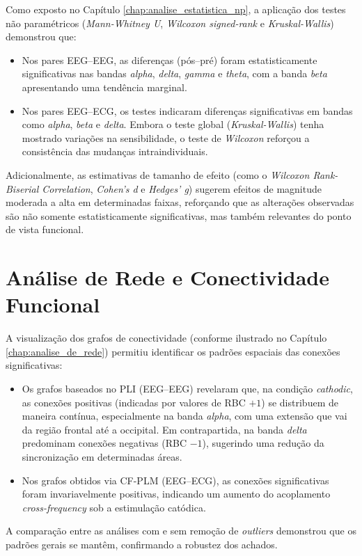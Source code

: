 Como exposto no Capítulo \ref{chap:analise_estatistica_np}, a aplicação dos testes não paramétricos (\textit{Mann-Whitney U}, \textit{Wilcoxon signed-rank} e \textit{Kruskal-Wallis}) demonstrou que:
\begin{itemize}
    \item Nos pares EEG--EEG, as diferenças (pós--pré) foram estatisticamente significativas nas bandas \emph{alpha}, \emph{delta}, \emph{gamma} e \emph{theta}, com a banda \emph{beta} apresentando uma tendência marginal.
    \item Nos pares EEG--ECG, os testes indicaram diferenças significativas em bandas como \emph{alpha}, \emph{beta} e \emph{delta}. Embora o teste global (\textit{Kruskal-Wallis}) tenha mostrado variações na sensibilidade, o teste de \textit{Wilcoxon} reforçou a consistência das mudanças intraindividuais.
\end{itemize}
Adicionalmente, as estimativas de tamanho de efeito (como o \textit{Wilcoxon Rank-Biserial Correlation}, \textit{Cohen's d} e \textit{Hedges' g}) sugerem efeitos de magnitude moderada a alta em determinadas faixas, reforçando que as alterações observadas são não somente estatisticamente significativas, mas também relevantes do ponto de vista funcional.

\section{Análise de Rede e Conectividade Funcional}
A visualização dos grafos de conectividade (conforme ilustrado no Capítulo \ref{chap:analise_de_rede}) permitiu identificar os padrões espaciais das conexões significativas:
\begin{itemize}
    \item Os grafos baseados no PLI (EEG--EEG) revelaram que, na condição \emph{cathodic}, as conexões positivas (indicadas por valores de RBC $+1$) se distribuem de maneira contínua, especialmente na banda \emph{alpha}, com uma extensão que vai da região frontal até a occipital. Em contrapartida, na banda \emph{delta} predominam conexões negativas (RBC $-1$), sugerindo uma redução da sincronização em determinadas áreas.
    \item Nos grafos obtidos via CF-PLM (EEG--ECG), as conexões significativas foram invariavelmente positivas, indicando um aumento do acoplamento \emph{cross-frequency} sob a estimulação catódica.
\end{itemize}
A comparação entre as análises com e sem remoção de \textit{outliers} demonstrou que os padrões gerais se mantêm, confirmando a robustez dos achados.

